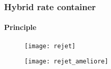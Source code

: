 
\subsubsection {Hybrid rate container}

\paragraph {Principle}
\begin{figure}[!ht]
	\centering
	\texttt{[image: rejet]}
\end{figure}

\begin{figure}[!ht]
	\centering
	\texttt{[image: rejet\_ameliore]}
\end{figure}